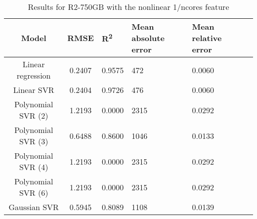 \begin{table}[H]
\centering
\begin{adjustbox}{center}
\begin{tabular}{c | c M{1.2cm} M{2.5cm} M{2.5cm} M{1.8cm}}
Model & RMSE & R\textsuperscript{2} & Mean absolute error & Mean relative error \tabularnewline
\hline
Linear regression & 0.2407 & 0.9575 &    472 & 0.0060 \\
Linear SVR & 0.2404 & 0.9726 &    476 & 0.0060 \\
Polynomial SVR (2) & 1.2193 & 0.0000 &   2315 & 0.0292 \\
Polynomial SVR (3) & 0.6488 & 0.8600 &   1046 & 0.0133 \\
Polynomial SVR (4) & 1.2193 & 0.0000 &   2315 & 0.0292 \\
Polynomial SVR (6) & 1.2193 & 0.0000 &   2315 & 0.0292 \\
Gaussian SVR & 0.5945 & 0.8089 &   1108 & 0.0139 \\
\end{tabular}
\end{adjustbox}
\\
\caption{Results for R2-750GB with the nonlinear 1/ncores feature}
\label{tab:all_nonlinear_R2_750}
\end{table}
